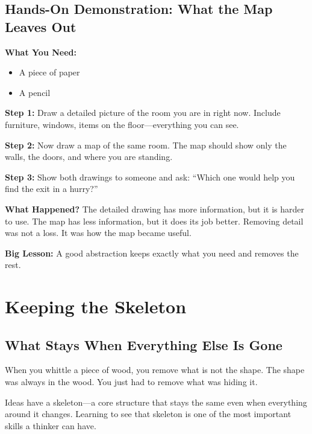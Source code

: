 \documentclass[12pt]{book}
\begin{document}
\section*{Hands-On Demonstration: What the Map Leaves Out}

\textbf{What You Need:}
\begin{itemize}
  \item A piece of paper
  \item A pencil
\end{itemize}

\textbf{Step 1:} Draw a detailed picture of the room you are in right now.
Include furniture, windows, items on the floor---everything you can see.

\textbf{Step 2:} Now draw a map of the same room. The map should show only
the walls, the doors, and where you are standing.

\textbf{Step 3:} Show both drawings to someone and ask: ``Which one would
help you find the exit in a hurry?''

\textbf{What Happened?} The detailed drawing has more information, but it
is harder to use. The map has less information, but it does its job better.
Removing detail was not a loss. It was how the map became useful.

\textbf{Big Lesson:} A good abstraction keeps exactly what you need and
removes the rest.

\chapter{Keeping the Skeleton}

\section{What Stays When Everything Else Is Gone}

When you whittle a piece of wood, you remove what is not the shape. The
shape was always in the wood. You just had to remove what was hiding it.

Ideas have a skeleton---a core structure that stays the same even when
everything around it changes. Learning to see that skeleton is one of the
most important skills a thinker can have.
\end{document}
